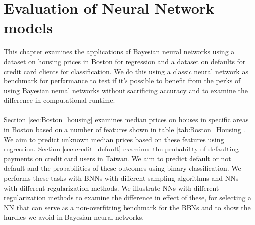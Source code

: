 \chapter{Evaluation of Neural Network models}
This chapter examines the applications of Bayesian neural networks using a dataset on housing prices in Boston for regression and a dataset on defaults for credit card clients for classification. We do this using a classic neural network as benchmark for performance to test if it's possible to benefit from the perks of using Bayesian neural networks without sacrificing accuracy and to examine the difference in computational runtime. \\
\\
Section \ref{sec:Boston_housing} examines median prices on houses in specific areas in Boston based on a number of features shown in table \ref{tab:Boston_Housing}. We aim to predict unknown median prices based on these features using regression. Section \ref{sec:credit_default} examines the probability of defaulting payments on credit card users in Taiwan. We aim to predict default or not default and the probabilities of these outcomes using binary classification. We performs these tasks with BNNs with different sampling algorithms and NNs with different regularization methods. We illustrate NNs with different regularization methods to examine the difference in effect of these, for selecting a NN that can serve as a non-overfitting benchmark for the BBNs and to show the hurdles we avoid in Bayesian neural networks. 


